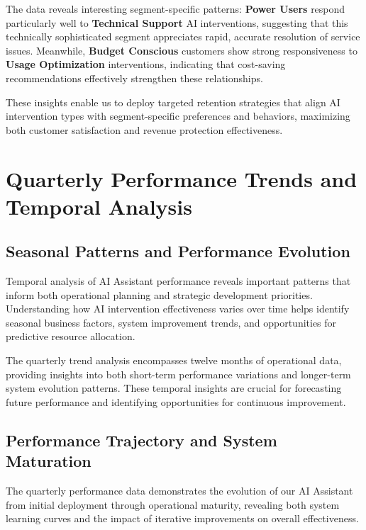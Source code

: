 \documentclass[
  letterpaper,
  DIV=11,
  numbers=noendperiod]{scrartcl}
\begin{document}
The data reveals interesting segment-specific patterns: \textbf{Power
Users} respond particularly well to \textbf{Technical Support} AI
interventions, suggesting that this technically sophisticated segment
appreciates rapid, accurate resolution of service issues. Meanwhile,
\textbf{Budget Conscious} customers show strong responsiveness to
\textbf{Usage Optimization} interventions, indicating that cost-saving
recommendations effectively strengthen these relationships.

These insights enable us to deploy targeted retention strategies that
align AI intervention types with segment-specific preferences and
behaviors, maximizing both customer satisfaction and revenue protection
effectiveness.

\section{Quarterly Performance Trends and Temporal
Analysis}\label{quarterly-performance-trends-and-temporal-analysis}

\subsection{Seasonal Patterns and Performance
Evolution}\label{seasonal-patterns-and-performance-evolution}

Temporal analysis of AI Assistant performance reveals important patterns
that inform both operational planning and strategic development
priorities. Understanding how AI intervention effectiveness varies over
time helps identify seasonal business factors, system improvement
trends, and opportunities for predictive resource allocation.

The quarterly trend analysis encompasses twelve months of operational
data, providing insights into both short-term performance variations and
longer-term system evolution patterns. These temporal insights are
crucial for forecasting future performance and identifying opportunities
for continuous improvement.

\subsection{Performance Trajectory and System
Maturation}\label{performance-trajectory-and-system-maturation}

The quarterly performance data demonstrates the evolution of our AI
Assistant from initial deployment through operational maturity,
revealing both system learning curves and the impact of iterative
improvements on overall effectiveness.
\end{document}
